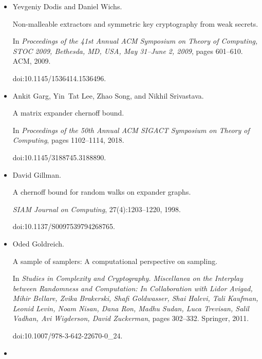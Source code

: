 \documentclass[10pt,a4paper]{article}
\begin{document}
\begin{itemize}
\item[] 
[15]

Yevgeniy Dodis and Daniel Wichs.


Non-malleable extractors and symmetric key cryptography from weak
secrets.


In \emph{Proceedings of the 41st Annual ACM Symposium on Theory of
Computing, STOC 2009, Bethesda, MD, USA, May 31–June 2, 2009}, pages
601–610. ACM, 2009.


doi:10.1145/1536414.1536496.





\item[] 
[16]

Ankit Garg, Yin Tat Lee, Zhao Song, and Nikhil Srivastava.


A matrix expander chernoff bound.


In \emph{Proceedings of the 50th Annual ACM SIGACT Symposium on Theory
of Computing}, pages 1102–1114, 2018.


doi:10.1145/3188745.3188890.





\item[] 
[17]

David Gillman.


A chernoff bound for random walks on expander graphs.


\emph{SIAM Journal on Computing}, 27(4):1203–1220, 1998.


doi:10.1137/S0097539794268765.





\item[] 
[18]

Oded Goldreich.


A sample of samplers: A computational perspective on sampling.


In \emph{Studies in Complexity and Cryptography. Miscellanea on the
Interplay between Randomness and Computation: In Collaboration with Lidor
Avigad, Mihir Bellare, Zvika Brakerski, Shafi Goldwasser, Shai Halevi, Tali
Kaufman, Leonid Levin, Noam Nisan, Dana Ron, Madhu Sudan, Luca Trevisan,
Salil Vadhan, Avi Wigderson, David Zuckerman}, pages 302–332. Springer,
2011.


doi:10.1007/978-3-642-22670-0\_24.





\item[] 
[19]


\end{itemize}
\end{document}
